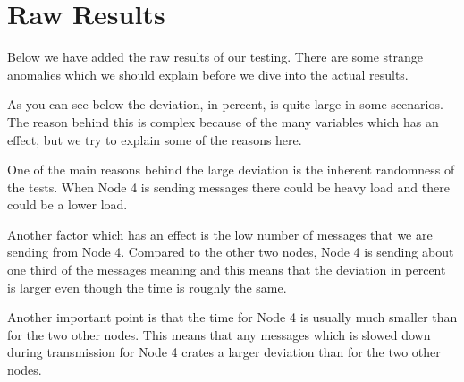 \section {Raw Results} \label{RawResults}
Below we have added the raw results of our testing. There are some strange anomalies which we should explain before we dive into the actual results.

As you can see below the deviation, in percent, is quite large in some scenarios. The reason behind this is complex because of the many variables which has an effect, but we try to explain some of the reasons here.

One of the main reasons behind the large deviation is the inherent randomness of the tests. When Node 4 is sending messages there could be heavy load and there could be a lower load. 

Another factor which has an effect is the low number of messages that we are sending from Node 4. Compared to the other two nodes, Node 4 is sending about one third of the messages meaning and this means that the deviation in percent is larger even though the time is roughly the same.

Another important point is that the time for Node 4 is usually much smaller than for the two other nodes. This means that any messages which is slowed down during transmission for Node 4 crates a larger deviation than for the two other nodes.
